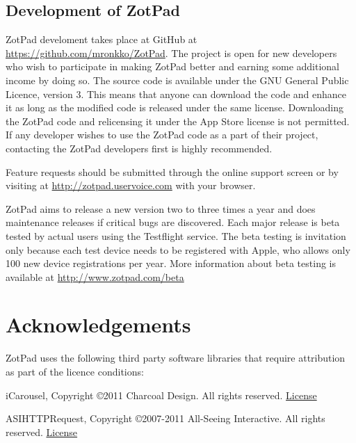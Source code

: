 \documentclass[oneside, openany, 12pt]{tufte-book}
\newcommand{\ipad}[1]{}
\newcommand{\ipad}[1]{#1}
\begin{document}
\section{Development of ZotPad}
	
ZotPad develoment takes place at GitHub at \url{https://github.com/mronkko/ZotPad}. The project is open for new developers who wish to participate in making ZotPad better and earning some additional income by doing so. The source code is available under the GNU General Public Licence, version 3. This means that anyone can download the code and enhance it as long as the modified code is released under the same license. Downloading the ZotPad code and relicensing it under the App Store license is not permitted. If any developer wishes to use the ZotPad code as a part of their project, contacting the ZotPad developers first is highly recommended.

Feature requests should be submitted through the online support screen or by visiting at \url{http://zotpad.uservoice.com} with your browser.

ZotPad aims to release a new version two to three times a year and does maintenance releases if critical bugs are discovered. Each major release is beta tested by actual users using the Testflight service. The beta testing is invitation only because each test device needs to be registered with Apple, who allows only 100 new device registrations per year. More information about beta testing is available at \url{http://www.zotpad.com/beta}

\chapter{Acknowledgements}

\ipad{\begin{fullwidth}}

\setlength{\parindent}{0pt}

\setlength{\parskip}{\baselineskip}

ZotPad uses the following third party software libraries that require attribution as part of the licence conditions:

iCarousel, Copyright \copyright 2011 Charcoal Design. All rights reserved. \href{https://raw.github.com/nicklockwood/iCarousel/104d499da7b107b8baa58ab85c6d0f44d504e957/LICENCE.md}{License}

ASIHTTPRequest, Copyright \copyright 2007-2011 All-Seeing Interactive. All rights reserved. \href{https://raw.github.com/pokeb/asi-http-request/3cb0230e547b0d13d88843ec7fc6ed77d69cb7c6/LICENSE}{License}
\end{document}
